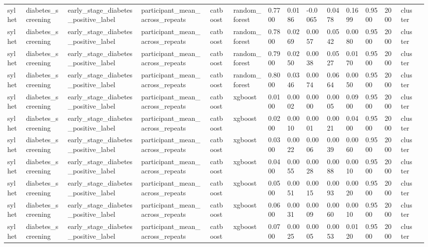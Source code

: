 \begin{tabular}{lllllllllllllll}
sylhet & diabetes\_screening & early\_stage\_diabetes\_positive\_label & participant\_mean\_across\_repeats & catboost & random\_forest & 0.7700 & 0.0186 & -0.0065 & 0.0478 & 0.1699 & 0.9500 & 2000 & cluster &  \\
sylhet & diabetes\_screening & early\_stage\_diabetes\_positive\_label & participant\_mean\_across\_repeats & catboost & random\_forest & 0.7800 & 0.0269 & 0.0057 & 0.0542 & 0.0080 & 0.9500 & 2000 & cluster &  \\
sylhet & diabetes\_screening & early\_stage\_diabetes\_positive\_label & participant\_mean\_across\_repeats & catboost & random\_forest & 0.7900 & 0.0250 & 0.0038 & 0.0527 & 0.0170 & 0.9500 & 2000 & cluster &  \\
sylhet & diabetes\_screening & early\_stage\_diabetes\_positive\_label & participant\_mean\_across\_repeats & catboost & random\_forest & 0.8000 & 0.0346 & 0.0074 & 0.0664 & 0.0050 & 0.9500 & 2000 & cluster &  \\
sylhet & diabetes\_screening & early\_stage\_diabetes\_positive\_label & participant\_mean\_across\_repeats & catboost & xgboost & 0.0100 & 0.0002 & 0.0000 & 0.0005 & 0.0900 & 0.9500 & 2000 & cluster &  \\
sylhet & diabetes\_screening & early\_stage\_diabetes\_positive\_label & participant\_mean\_across\_repeats & catboost & xgboost & 0.0200 & 0.0010 & 0.0001 & 0.0021 & 0.0400 & 0.9500 & 2000 & cluster &  \\
sylhet & diabetes\_screening & early\_stage\_diabetes\_positive\_label & participant\_mean\_across\_repeats & catboost & xgboost & 0.0300 & 0.0022 & 0.0006 & 0.0039 & 0.0060 & 0.9500 & 2000 & cluster &  \\
sylhet & diabetes\_screening & early\_stage\_diabetes\_positive\_label & participant\_mean\_across\_repeats & catboost & xgboost & 0.0400 & 0.0055 & 0.0028 & 0.0088 & 0.0010 & 0.9500 & 2000 & cluster &  \\
sylhet & diabetes\_screening & early\_stage\_diabetes\_positive\_label & participant\_mean\_across\_repeats & catboost & xgboost & 0.0500 & 0.0051 & 0.0015 & 0.0093 & 0.0020 & 0.9500 & 2000 & cluster &  \\
sylhet & diabetes\_screening & early\_stage\_diabetes\_positive\_label & participant\_mean\_across\_repeats & catboost & xgboost & 0.0600 & 0.0031 & 0.0009 & 0.0060 & 0.0010 & 0.9500 & 2000 & cluster &  \\
sylhet & diabetes\_screening & early\_stage\_diabetes\_positive\_label & participant\_mean\_across\_repeats & catboost & xgboost & 0.0700 & 0.0025 & 0.0005 & 0.0053 & 0.0120 & 0.9500 & 2000 & cluster &  \\

\end{tabular}

